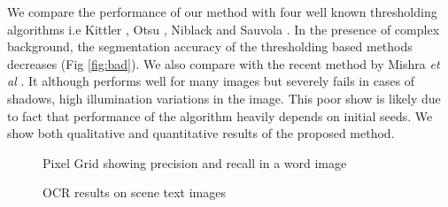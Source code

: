 We compare the performance of our method with four well known thresholding algorithms 
i.e Kittler \cite{A5}, Otsu \cite{A2}, Niblack \cite{A9} and Sauvola \cite{A6}.
In the presence of complex
background, the segmentation accuracy of the thresholding based methods decreases (Fig \ref{fig:bad}).
We also compare with the recent method by Mishra \emph{et al} \cite{A16}.
It although performs well for many images but severely
fails in cases of shadows, high illumination variations 
in the image. This poor show is likely due to fact that
performance of the algorithm heavily depends on initial seeds.
We show both qualitative and quantitative results of the proposed method. 
\begin{figure}[p]
\centering
{}
\label{fig:accuracy}
\caption
{Pixel Grid showing precision and recall in a word image}
\vspace{6mm}
\label{fig:ocr}
\caption
{OCR results on scene text images}
\end{figure}
